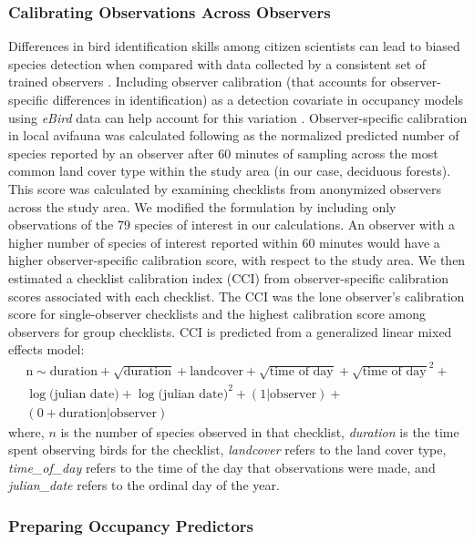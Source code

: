 \subsubsection*{Calibrating Observations Across Observers}

Differences in bird identification skills among citizen scientists can lead to biased species detection when compared with data collected by a consistent set of trained observers \citep{vanstrien2013}.
Including observer calibration (that accounts for observer-specific differences in identification) as a detection covariate in occupancy models using \textit{eBird} data can help account for this variation \citep{johnston2018}.
Observer-specific calibration in local avifauna was calculated following \textcite{kelling2015a} as the normalized predicted number of species reported by an observer after 60 minutes of sampling across the most common land cover type within the study area (in our case, deciduous forests).
This score was calculated by examining checklists from anonymized observers across the study area.
We modified the \citep{kelling2015a} formulation by including only observations of the 79 species of interest in our calculations.
An observer with a higher number of species of interest reported within 60 minutes would have a higher observer-specific calibration score, with respect to the study area.
We then estimated a checklist calibration index (CCI) from observer-specific calibration scores associated with each checklist.
The CCI was the lone observer's calibration score for single-observer checklists and the highest calibration score among observers for group checklists.
CCI is predicted from a generalized linear mixed effects model:
\begin{multline*}
    \text{n} \sim \text{duration} + \sqrt{\text{duration}} + \text{landcover} + \sqrt{\text{time of day}} + \sqrt{\text{time of day}}^2 + \\ \log({\text{julian date})} + \log({\text{julian date})}^2 + (1 | \text{observer}) + \\(0 + \text{duration} | \text{observer})
\end{multline*}
where, $n$ is the number of species observed in that checklist, \textit{duration} is the time spent observing birds for the checklist, \textit{landcover} refers to the land cover type, \textit{time\_of\_day} refers to the time of the day that observations were made, and \textit{julian\_date} refers to the ordinal day of the year.

\subsubsection*{Preparing Occupancy Predictors}

